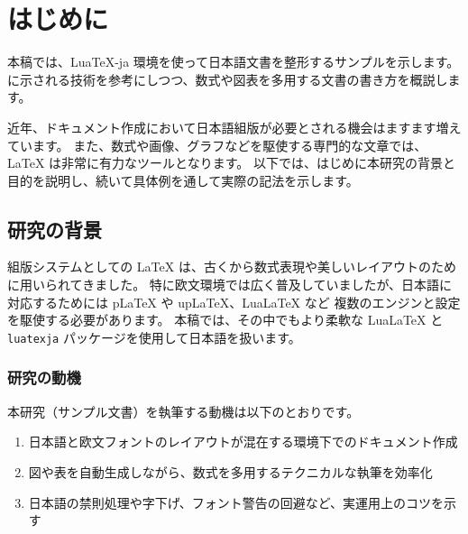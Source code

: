 \documentclass[a4paper,10.5pt]{ltjsarticle}
\begin{document}

\tableofcontents
\thispagestyle{empty}


\setcounter{page}{1}

\clearpage
\section{はじめに}
本稿では、Lua\TeX-ja 環境を使って日本語文書を整形するサンプルを示します。
\cite{Example2023} に示される技術を参考にしつつ、数式や図表を多用する文書の書き方を概説します。

近年、ドキュメント作成において日本語組版が必要とされる機会はますます増えています。
また、数式や画像、グラフなどを駆使する専門的な文章では、LaTeX は非常に有力なツールとなります。
以下では、はじめに本研究の背景と目的を説明し、続いて具体例を通して実際の記法を示します。

\subsection{研究の背景}
組版システムとしての LaTeX は、古くから数式表現や美しいレイアウトのために用いられてきました。
特に欧文環境では広く普及していましたが、日本語に対応するためには pLaTeX や upLaTeX、LuaLaTeX など
複数のエンジンと設定を駆使する必要があります。  
本稿では、その中でもより柔軟な LuaLaTeX と \texttt{luatexja} パッケージを使用して日本語を扱います。

\subsubsection{研究の動機}
本研究（サンプル文書）を執筆する動機は以下のとおりです。
\begin{enumerate}
  \item 日本語と欧文フォントのレイアウトが混在する環境下でのドキュメント作成
  \item 図や表を自動生成しながら、数式を多用するテクニカルな執筆を効率化
  \item 日本語の禁則処理や字下げ、フォント警告の回避など、実運用上のコツを示す
\end{enumerate}

\end{document}
